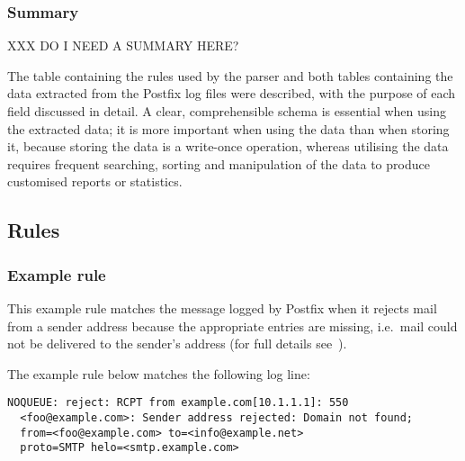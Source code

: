 \subsubsection{Summary}

XXX DO I NEED A SUMMARY HERE\@?

The table containing the rules used by the parser and both tables
containing the data extracted from the Postfix log files were described,
with the purpose of each field discussed in detail.  A clear,
comprehensible schema is essential when using the extracted data; it is
more important when using the data than when storing it, because storing
the data is a write-once operation, whereas utilising the data requires
frequent searching, sorting and manipulation of the data to produce
customised reports or statistics.


\subsection{Rules}

\label{rules}

\subsubsection{Example rule}

\label{example rule}

This example rule matches the message logged by Postfix when it rejects
mail from a sender address because the appropriate \DNS{} entries are
missing, i.e.\ mail could not be delivered to the sender's address (for
full details see~\cite{reject-unknown-sender-domain}).

The example rule below matches the following log line:

\begin{verbatim}
NOQUEUE: reject: RCPT from example.com[10.1.1.1]: 550
  <foo@example.com>: Sender address rejected: Domain not found;
  from=<foo@example.com> to=<info@example.net>
  proto=SMTP helo=<smtp.example.com>
\end{verbatim}

